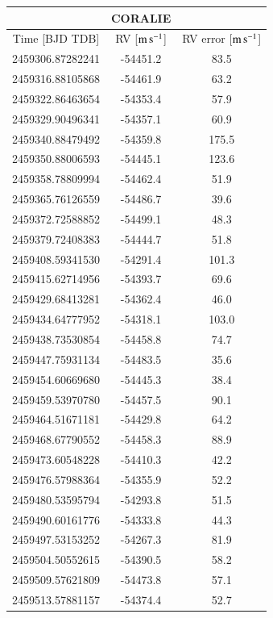 \documentclass{aa}
\newcommand{\ms}{\mbox{m\,s$^{-1}$}}
\begin{document}
\begin{appendix}
%
\begin{table}
\footnotesize
    \centering
    \begin{tabular}{ccc}
        & CORALIE & \\ 
        \hline\hline
        Time [BJD TDB] & RV [$\ms$] & RV error [$\ms$] \\
        \hline
2459306.87282241 & -54451.2  & 83.5 \\ 
2459316.88105868 & -54461.9  & 63.2 \\ 
2459322.86463654 & -54353.4  & 57.9 \\ 
2459329.90496341 & -54357.1  & 60.9 \\ 
2459340.88479492 & -54359.8  & 175.5 \\ 
2459350.88006593 & -54445.1  & 123.6 \\ 
2459358.78809994 & -54462.4  & 51.9 \\ 
2459365.76126559 & -54486.7  & 39.6 \\ 
2459372.72588852 & -54499.1  & 48.3 \\ 
2459379.72408383 & -54444.7  & 51.8 \\ 
2459408.59341530 & -54291.4  & 101.3 \\ 
2459415.62714956 & -54393.7  & 69.6 \\ 
2459429.68413281 & -54362.4  & 46.0 \\ 
2459434.64777952 & -54318.1  & 103.0 \\ 
2459438.73530854 & -54458.8  & 74.7 \\ 
2459447.75931134 & -54483.5  & 35.6 \\ 
2459454.60669680 & -54445.3  & 38.4 \\ 
2459459.53970780 & -54457.5  & 90.1 \\ 
2459464.51671181 & -54429.8  & 64.2 \\ 
2459468.67790552 & -54458.3  & 88.9 \\ 
2459473.60548228 & -54410.3  & 42.2 \\ 
2459476.57988364 & -54355.9  & 52.2 \\ 
2459480.53595794 & -54293.8  & 51.5 \\ 
2459490.60161776 & -54333.8  & 44.3 \\ 
2459497.53153252 & -54267.3  & 81.9 \\ 
2459504.50552615 & -54390.5  & 58.2 \\ 
2459509.57621809 & -54473.8  & 57.1 \\ 
2459513.57881157 & -54374.4  & 52.7 \\ 

\end{tabular}
\end{table}
\end{appendix}
\end{document}
